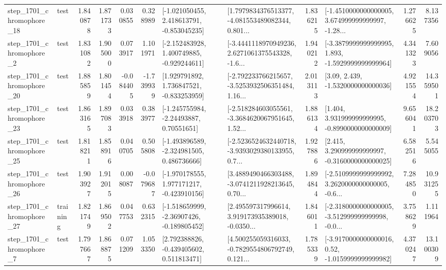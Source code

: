 \begin{tabular}{llrrrrllrlrr}
 step\_1701\_chromophore\_18 &      test &      1.840878 &    1.871733 &      0.030855 &  0.328989 &   [-1.021050455, 2.418613791, -0.853045235] &  [1.7979834376513377, -4.081553489082344, 0.801... &       1.836215 &  [-1.4510000000000005, 3.674999999999997, -1.28... &            1.276625 &          8.137356 \\
  step\_1701\_chromophore\_2 &      test &      1.831082 &    1.905000 &      0.073917 &  1.101971 &   [-2.152483928, 1.400749885, -0.929244611] &  [-3.4441118970949236, 2.6271061375543328, -1.6... &       1.940212 &  [-3.3879999999999995, 1.893, -1.5929999999999964] &            4.341323 &          7.609056 \\
 step\_1701\_chromophore\_20 &      test &      1.885859 &    1.801454 &     -0.084405 & -1.739939 &    [1.929791892, 1.736847521, -0.833253959] &  [-2.792233766215657, -3.5253932506351484, 1.16... &       2.013113 &                 [3.09, 2.439, -1.5320000000000036] &            4.921554 &         14.359501 \\
 step\_1701\_chromophore\_23 &      test &      1.863165 &    1.897083 &      0.033918 &  0.383977 &     [-1.245755984, -2.24493887, 0.70551651] &  [-2.518284603055561, -3.3684620067951645, 1.52... &       1.886134 &    [1.404, 3.931999999999995, -0.8990000000000009] &            9.656041 &         18.203703 \\
 step\_1701\_chromophore\_25 &      test &      1.818211 &    1.858916 &      0.040705 &  0.505808 &   [-1.493896589, -2.324981505, 0.486736666] &  [-2.5236524632440718, -3.9393029380133955, 0.7... &       1.927886 &    [2.415, 3.290999999999997, -0.3160000000000025] &            6.582516 &          5.545055 \\
 step\_1701\_chromophore\_26 &      test &      1.903927 &    1.912015 &      0.008087 & -0.079687 &   [-1.970178555, 1.977171217, -0.423910156] &  [3.4889490466303488, -3.0741211928213645, 0.70... &       1.894844 &  [-2.5109999999999992, 3.2620000000000005, -0.6... &            7.284850 &         10.931255 \\
 step\_1701\_chromophore\_27 &  training &      1.821749 &    1.869502 &      0.047753 &  0.632315 &   [-1.518659999, -2.36907426, -0.189805452] &  [2.495597317996614, 3.919173935389018, -0.0350... &       1.846011 &  [-2.3180000000000005, -3.512999999999998, -0.0... &            3.758629 &          1.111964 \\
  step\_1701\_chromophore\_7 &      test &      1.797667 &    1.868875 &      0.071209 &  1.053350 &    [2.792388826, -0.439405602, 0.511813471] &  [4.500255059316033, -0.7829554806792749, 0.121... &       1.785339 &   [-3.9170000000000016, 0.52, -1.0159999999999982] &            4.370247 &         13.100309 \\

\end{tabular}
